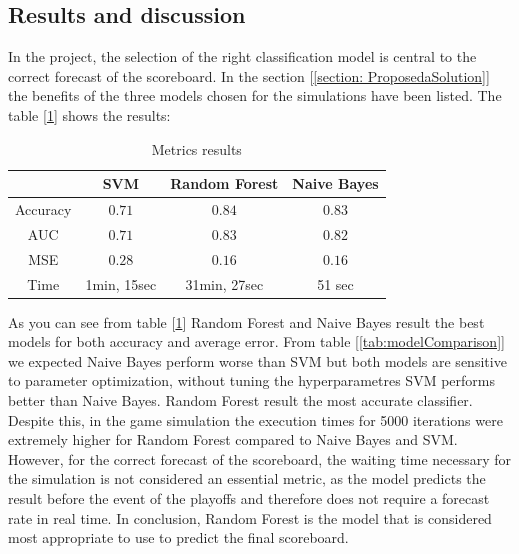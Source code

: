 \documentclass{article}
\begin{document}
\subsection{Results and discussion}
\label{ResultsAndDiscussion}
In the project, the selection of the right classification model is central to the correct forecast of the scoreboard. In the section [\ref{section: ProposedaSolution}] the benefits of the three models chosen for the simulations have been listed. The table [\ref{tab:results}] shows the results:
\begin{table}[H]
	\centering
	\begin{tabular}{c|c|c|c}
	\toprule
	& SVM & Random Forest & Naive Bayes\\
    \midrule
    Accuracy & $0.71$ & $0.84$ & $0.83$ \\
    \midrule
    AUC & $0.71$ & $0.83$ & $0.82$ \\
    \midrule
    MSE & $0.28$ & $0.16$ & $0.16$ \\
    \midrule
    Time & 1min, 15sec & 31min, 27sec & 51 sec \\
	\bottomrule
	\end{tabular}
\caption{Metrics results}
\label{tab:results}
\end{table}
\indent As you can see from table [\ref{tab:results}] Random Forest and Naive Bayes result the best models for both accuracy and average error. From table [\ref{tab:modelComparison}] we expected Naive Bayes perform worse than SVM but both models are sensitive to parameter optimization, without tuning the hyperparametres SVM performs better than Naive Bayes. Random Forest result the most accurate classifier. Despite this, in the game simulation the execution times for 5000 iterations were extremely higher for Random Forest compared to Naive Bayes and SVM. However, for the correct forecast of the scoreboard, the waiting time necessary for the simulation is not considered an essential metric, as the model predicts the result before the event of the playoffs and therefore does not require a forecast rate in real time. In conclusion, Random Forest is the model that is considered most appropriate to use to predict the final scoreboard. 
\end{document}
